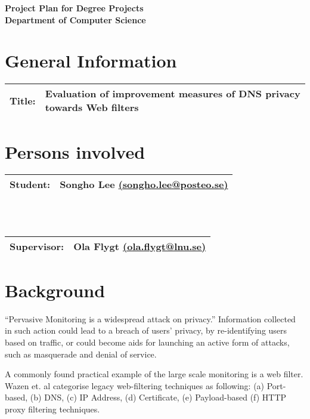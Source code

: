 \documentclass[a4paper,12pt]{article}
\begin{document}
\begin{center}
\Large \textbf{Project Plan for Degree Projects} \\
\large \textbf{Department of Computer Science}
\end{center}

\section*{General Information}
\begin{tabular} {|p{3.8cm}|p{10.3cm}|} \hline
Title: & Evaluation of improvement measures of DNS privacy towards Web filters \\ \hline
\end{tabular}

\section*{Persons involved}
\begin{tabular} {|p{3.8cm}|p{10.3cm}|} \hline
Student: & Songho Lee \href {mailto:songho.lee@posteo.se}{(songho.lee@posteo.se)} \\ \hline
\end{tabular}
\\ \vspace*{0.2cm} \\
\begin{tabular} {|p{3.8cm}|p{10.3cm}|} \hline
Supervisor: & Ola Flygt \href {mailto:ola.flygt@lnu.se}{(ola.flygt@lnu.se)} \\ \hline
\end{tabular}

\section*{Background}
``Pervasive Monitoring is a widespread attack on privacy\cite{rfc7258}.'' Information collected in such action could lead to a breach of users’ privacy, by re-identifying users based on traffic\cite{herrmann2010analyzing}, or could become aids for launching an active form of attacks, such as masquerade and denial of service.

A commonly found practical example of the large scale monitoring is a web filter\cite{murdoch2008tools}. Wazen et. al categorise legacy web-filtering techniques as following: (a) Port-based, (b) DNS, (c) IP Address, (d) Certificate, (e) Payload-based (f) HTTP proxy filtering techniques\cite{shbair2015efficiently}.
\end{document}
